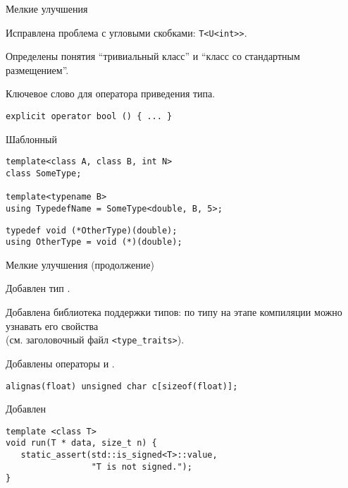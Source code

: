 \documentclass{beamer}
\begin{document}
\begin{frame}[fragile]{Мелкие улучшения}
\begin{enumerate}
    \pitem Исправлена проблема с угловыми скобками: {\tt T<U<int{>}>}.

    \pitem Определены понятия ``тривиальный класс'' и ``класс со стандартным размещением''.
    
    \pitem Ключевое слово  для оператора приведения типа.
\begin{lstlisting}
explicit operator bool () { ... }
\end{lstlisting}

    \pitem Шаблонный 
\begin{lstlisting}
template<class A, class B, int N> 
class SomeType;

template<typename B>
using TypedefName = SomeType<double, B, 5>;
\end{lstlisting}
\pause
\begin{lstlisting}
typedef void (*OtherType)(double); 
using OtherType = void (*)(double);
\end{lstlisting}
\end{enumerate}
\end{frame}


\begin{frame}[fragile]{Мелкие улучшения (продолжение)}
\begin{enumerate} \setcounter{enumi}{4}
    \pitem Добавлен тип .

    \pitem Добавлена библиотека поддержки типов: по типу на этапе компиляции можно узнавать его свойства\\ (см. заголовочный файл \texttt{<type\_traits>}).

    \pitem Добавлены операторы  и .
\begin{lstlisting}
alignas(float) unsigned char c[sizeof(float)];
\end{lstlisting}

    \pitem Добавлен 
\begin{lstlisting}
template <class T>
void run(T * data, size_t n) {
   static_assert(std::is_signed<T>::value, 
                 "T is not signed.");
}
\end{lstlisting}

%
% 
\end{enumerate}
\end{frame}
\end{document}
